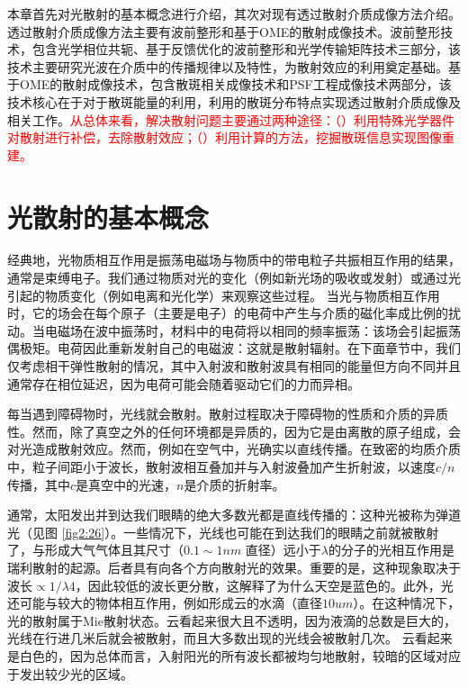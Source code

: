 本章首先对光散射的基本概念进行介绍，其次对现有透过散射介质成像方法介绍\cite{ZhuLei2020}。
透过散射介质成像方法主要有波前整形和基于OME的散射成像技术。波前整形技术，包含光学相位共轭、基于反馈优化的波前整形和光学传输矩阵技术三部分，该技术主要研究光波在介质中的传播规律以及特性，为散射效应的利用奠定基础。基于OME的散射成像技术，包含散斑相关成像技术和PSF工程成像技术两部分，该技术核心在于对于散斑能量的利用，利用的散斑分布特点实现透过散射介质成像及相关工作。\textcolor{red}{从总体来看，解决散射问题主要通过两种途径：（）利用特殊光学器件对散射进行补偿，去除散射效应；（）利用计算的方法，挖掘散斑信息实现图像重建。}

\section{光散射的基本概念}

经典地，光物质相互作用是振荡电磁场与物质中的带电粒子共振相互作用的结果，通常是束缚电子。我们通过物质对光的变化（例如新光场的吸收或发射）或通过光引起的物质变化（例如电离和光化学）来观察这些过程。
当光与物质相互作用时，它的场会在每个原子（主要是电子）的电荷中产生与介质的磁化率成比例的扰动。当电磁场在波中振荡时，材料中的电荷将以相同的频率振荡：该场会引起振荡偶极矩。电荷因此重新发射自己的电磁波：这就是散射辐射。在下面章节中，我们仅考虑相干弹性散射的情况，其中入射波和散射波具有相同的能量但方向不同并且通常存在相位延迟，因为电荷可能会随着驱动它们的力而异相。

每当遇到障碍物时，光线就会散射。散射过程取决于障碍物的性质和介质的异质性。然而，除了真空之外的任何环境都是异质的，因为它是由离散的原子组成，会对光造成散射效应。然而，例如在空气中，光确实以直线传播。在致密的均质介质中，粒子间距小于波长，散射波相互叠加并与入射波叠加产生折射波，以速度$c/n$传播，其中$c$是真空中的光速，$n$是介质的折射率\cite{bohren_absorption_2008}。

通常，太阳发出并到达我们眼睛的绝大多数光都是直线传播的：这种光被称为弹道光（见图 \ref{fig2:26}）。一些情况下，光线也可能在到达我们的眼睛之前就被散射了，与形成大气气体且其尺寸（$0.1 \sim 1 nm$ 直径）远小于$\lambda$的分子的光相互作用是瑞利散射的起源。后者具有向各个方向散射光的效果。重要的是，这种现象取决于波长$\propto 1/ \lambda 4$，因此较低的波长更分散，这解释了为什么天空是蓝色的。此外，光还可能与较大的物体相互作用，例如形成云的水滴（直径$10 um$）。在这种情况下，光的散射属于Mie散射状态\cite{noauthor_mie_2022}。云看起来很大且不透明，因为液滴的总数是巨大的，光线在行进几米后就会被散射，而且大多数出现的光线会被散射几次。 云看起来是白色的，因为总体而言，入射阳光的所有波长都被均匀地散射，较暗的区域对应于发出较少光的区域。

